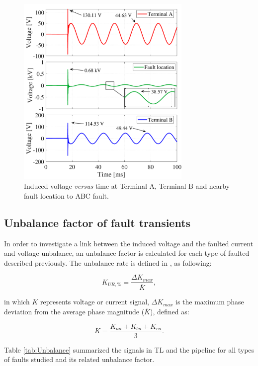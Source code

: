 \documentclass[5p,twocolumn]{elsarticle}
\begin{document}
\begin{figure}[h]
	\begin{center}
		\includegraphics[width=8.4cm]{img/ABCindVoltage_3plots.pdf}    %
		\caption{Induced voltage \textit{versus} time at Terminal A, Terminal B and nearby fault location to ABC fault.} 
		\label{fig:ABCindVoltage3plots}
	\end{center}
\end{figure}

\subsection{Unbalance factor of fault transients}

In order to investigate a link between the induced voltage and the faulted current and voltage unbalance, an unbalance factor is calculated for each type of faulted described previously. The unbalance rate is defined in \cite{IEEE1993}, as following:

\begin{equation}
	K_{UR,\%} = \frac{\Delta K_{max}}{\overline{K}},
\end{equation}

\noindent in which $K$ represents voltage or current signal, $\Delta K_{max}$ is the maximum phase deviation from the average phase magnitude ($\overline{K}$), defined as:

\begin{equation}
	\overline{K} = \frac{K_{an} + K_{bn} + K_{cn}}{3}.
\end{equation}

Table \ref{tab:Unbalance} summarized the signals in TL and the pipeline for all types of faults studied and its related unbalance factor.
\end{document}
